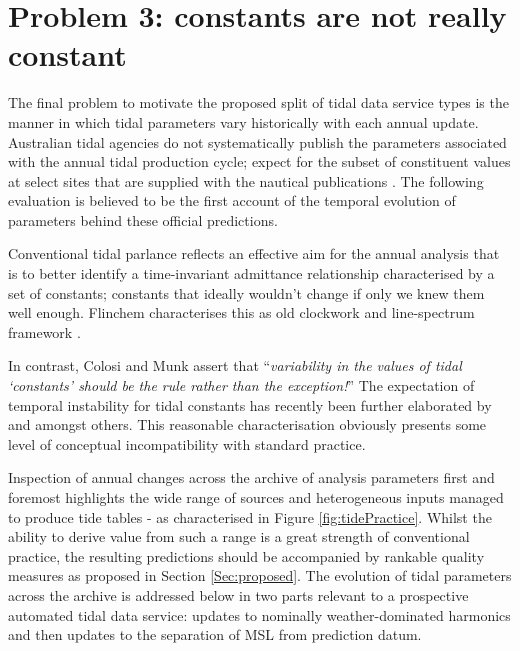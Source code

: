 \section{Problem 3: constants are not really constant}
\label{Sec:Evolution}
The final problem to motivate the proposed split of tidal data service types is the manner in which tidal parameters vary historically with each annual update.
Australian tidal agencies do not systematically publish the parameters associated with the annual tidal production cycle; expect for the subset of constituent values at select sites that are supplied with the nautical publications \citep{austides}.  The following evaluation is believed to be the first account of the temporal evolution of parameters behind these official predictions.  

Conventional tidal parlance reflects an effective aim for the annual analysis that is to better identify a time-invariant admittance relationship characterised by a set of constants; constants that ideally wouldn't change if only we knew them well enough. Flinchem characterises this as old clockwork and  line-spectrum framework \citep{Flinchem:2000kp}. 

In contrast, Colosi and Munk assert that ``\textit{variability in the values of tidal `constants' should be the rule rather than the exception!}'' \citep{Colosi:2006va}
The expectation of temporal instability for tidal constants has recently been further elaborated by  \citet{10.1029/2018rg000636} and \citet{10.1002/2017jc013165} amongst others.    This reasonable characterisation obviously presents some level of conceptual incompatibility with standard practice.

Inspection of annual changes across the archive of analysis parameters first and foremost highlights the wide range of sources and heterogeneous inputs managed to produce tide tables - as characterised in Figure \ref{fig:tidePractice}.    Whilst the ability to derive value from such a range is a great strength of conventional practice, the resulting predictions  should be accompanied by rankable quality measures as proposed in Section \ref{Sec:proposed}.
The evolution of tidal parameters across the archive is addressed below in two parts relevant to a prospective automated tidal data service:  updates to nominally weather-dominated harmonics and then updates to the separation of MSL from prediction datum.

